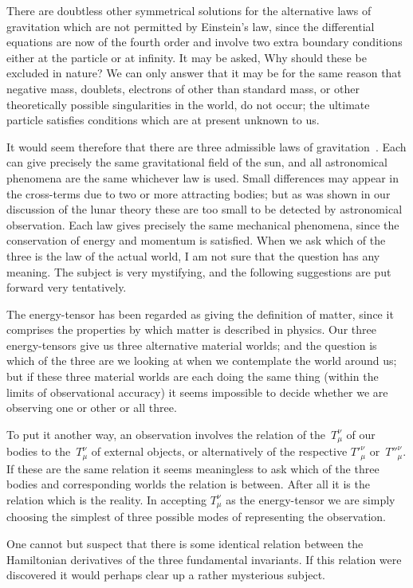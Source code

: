 \documentclass[12pt]{book}
\begin{document}
There are doubtless other symmetrical solutions for the alternative laws
of gravitation which are not permitted by Einstein's law, since the differential
equations are now of the fourth order and involve two extra boundary conditions
either at the particle or at infinity. It may be asked, Why should
these be excluded in nature? We can only answer that it may be for the
same reason that negative mass, doublets, electrons of other than standard
mass, or other theoretically possible singularities in the world, do not occur;
the ultimate particle satisfies conditions which are at present unknown to us.

It would seem therefore that there are three admissible laws of gravitation~.
Each can give precisely the same gravitational field of the sun, and
all astronomical phenomena are the same whichever law is used. Small
differences may appear in the cross-terms due to two or more attracting
bodies; but as was shown in our discussion of the lunar theory these are too
small to be detected by astronomical observation. Each law gives precisely
the same mechanical phenomena, since the conservation of energy and
momentum is satisfied. When we ask which of the three is the law of the
actual world, I am not sure that the question has any meaning. The subject
is very mystifying, and the following suggestions are put forward very
tentatively.

The energy-tensor has been regarded as giving the definition of matter,
since it comprises the properties by which matter is described in physics.
Our three energy-tensors give us three alternative material worlds; and the
question is which of the three are we looking at when we contemplate the
world around us; but if these three material worlds are each doing the same
thing (within the limits of observational accuracy) it seems impossible to
decide whether we are observing one or other or all three.

To put it another way, an observation involves the relation of the~$T_{\mu}^{\nu}$ of
our bodies to the~$T_{\mu}^{\nu}$ of external objects, or alternatively of the respective
${T'}_{\mu}^{\nu}$ or~${T''}_{\mu}^{\nu}$. If these are the same relation it seems meaningless to ask which
of the three bodies and corresponding worlds the relation is between. After
all it is the relation which is the reality. In accepting $T_{\mu}^{\nu}$ as the energy-tensor
we are simply choosing the simplest of three possible modes of representing
the observation.

One cannot but suspect that there is some identical relation between the
Hamiltonian derivatives of the three fundamental invariants. If this relation
were discovered it would perhaps clear up a rather mysterious subject.
\end{document}
